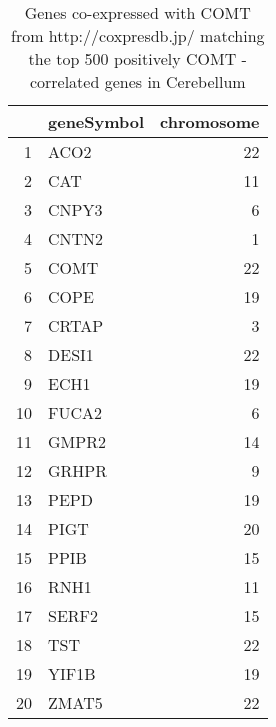 \documentclass[letterpaper,12pt]{article}
\numberwithin{equation}{appendix}
\begin{document}
{{\clearpage
\begin{table}[ht]
\centering
\begin{tabular}{rlr}
  \hline
 & geneSymbol & chromosome \\ 
  \hline
1 & ACO2 &  22 \\ 
  2 & CAT &  11 \\ 
  3 & CNPY3 &   6 \\ 
  4 & CNTN2 &   1 \\ 
  5 & COMT &  22 \\ 
  6 & COPE &  19 \\ 
  7 & CRTAP &   3 \\ 
  8 & DESI1 &  22 \\ 
  9 & ECH1 &  19 \\ 
  10 & FUCA2 &   6 \\ 
  11 & GMPR2 &  14 \\ 
  12 & GRHPR &   9 \\ 
  13 & PEPD &  19 \\ 
  14 & PIGT &  20 \\ 
  15 & PPIB &  15 \\ 
  16 & RNH1 &  11 \\ 
  17 & SERF2 &  15 \\ 
  18 & TST &  22 \\ 
  19 & YIF1B &  19 \\ 
  20 & ZMAT5 &  22 \\ 
   \hline
\end{tabular}
\caption{Genes co-expressed with COMT from http://coxpresdb.jp/ matching the top 500 positively COMT - correlated genes in Cerebellum} 
\end{table}

}}
\end{document}
